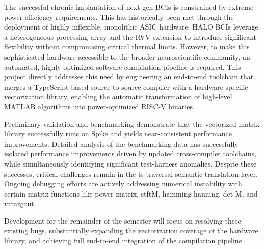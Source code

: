 


The successful chronic implantation of next-gen BCIs is constrained by extreme power efficiency requirements. This has historically been met through the deployment of highly inflexible, monolithic ASIC hardware. HALO BCIs leverage a heterogeneous processing array and the RVV extension to introduce significant flexibility without compromising critical thermal limits. However, to make this sophisticated hardware accessible to the broader neuroscientific community, an automated, highly optimized software compilation pipeline is required. This project directly addresses this need by engineering an end-to-end toolchain that merges a TypeScript-based source-to-source compiler with a hardware-specific vectorization library, enabling the automatic transformation of high-level MATLAB algorithms into power-optimized RISC-V binaries.

Preliminary validation and benchmarking demonstrate that the vectorized matrix library successfully runs on Spike and yields near-consistent performance improvements. Detailed analysis of the benchmarking data has successfully isolated performance improvements driven by updated cross-compiler toolchains, while simultaneously identifying significant test-harness anomalies. Despite these successes, critical challenges remain in the ts-traversal semantic translation layer. Ongoing debugging efforts are actively addressing numerical instability with certain matrix functions like power matrix, stftM, hamming hanning, det M, and varargout. 

Development for the remainder of the semester will focus on resolving these existing bugs, substantially expanding the vectorization coverage of the hardware library, and achieving full end-to-end integration of the compilation pipeline.